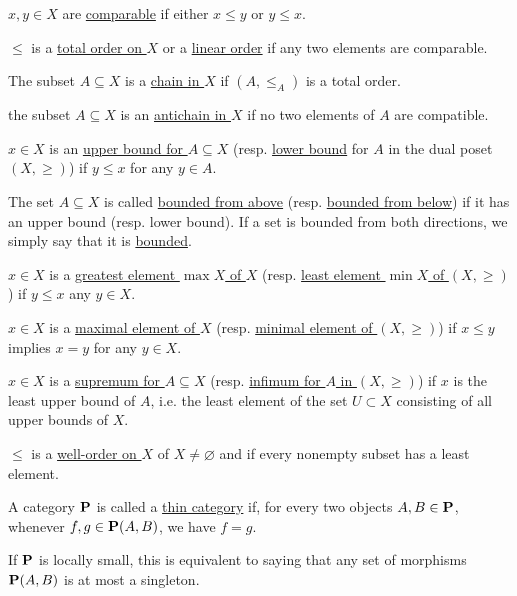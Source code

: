 \begin{definition}
\begin{defenum}
    \item\label{def:poset/comparable_elements} $x, y \in X$ are \ul{comparable} if either $x \leq y$ or $y \leq x$.
    \item\label{def:poset/total_order} $\leq$ is a \ul{total order on $X$} or a \ul{linear order} if any two elements are comparable.
    \item\label{def:poset/chain} The subset $A \subseteq X$ is a \ul{chain in $X$} if $(A, \leq_A)$ is a total order.
    \item\label{def:poset/antichain} the subset $A \subseteq X$ is an \ul{antichain in $X$} if no two elements of $A$ are compatible.
    \item\label{def:poset/upper_lower_bound} $x \in X$ is an \ul{upper bound for $A \subseteq X$} (resp. \ul{lower bound} for $A$ in the dual poset $(X, \geq)$) if $y \leq x$ for any $y \in A$.
    \item\label{def:poset/bounded_set} The set $A \subseteq X$ is called \ul{bounded from above} (resp. \ul{bounded from below}) if it has an upper bound (resp. lower bound). If a set is bounded from both directions, we simply say that it is \ul{bounded}.
    \item\label{def:poset/greatest_least_element} $x \in X$ is a \ul{greatest element $\max X$ of $X$} (resp. \ul{least element $\min X$ of $(X, \geq)$}) if $y \leq x$ any $y \in X$.
    \item\label{def:poset/maximal_minimal_element} $x \in X$ is a \ul{maximal element of $X$} (resp. \ul{minimal element of $(X, \geq)$}) if $x \leq y$ implies $x = y$ for any $y \in X$.
    \item\label{def:poset/supremum_infimum} $x \in X$ is a \ul{supremum for $A \subseteq X$} (resp. \ul{infimum for $A$ in $(X, \geq)$}) if $x$ is the least upper bound of $A$, i.e. the least element of the set $U \subset X$ consisting of all upper bounds of $X$.
    \item\label{def:poset/well_order} $\leq$ is a \ul{well-order on $X$} of $X \neq \varnothing$ and if every nonempty subset has a least element.
  \end{defenum}
\end{definition}

\begin{definition}\label{def:thin_category}\cite{nLab:thin_category}
  A category $\operatorname{\mathbf{P}}$ is called a \ul{thin category} if, for every two objects $A, B \in \operatorname{\mathbf{P}}$, whenever $f, g \in \operatorname{\mathbf{P}}(A, B)$, we have $f = g$.

  If $\operatorname{\mathbf{P}}$ is locally small, this is equivalent to saying that any set of morphisms $\operatorname{\mathbf{P}}(A, B)$ is at most a singleton.
\end{definition}

